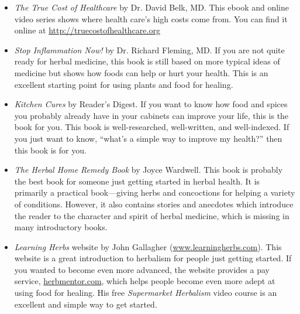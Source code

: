\begin{itemize}
\item 
\textit{The True Cost of Healthcare} by Dr. David Belk, MD.  This ebook and online
video series shows where health care's high costs come from.  You can find it online
at \url{http://truecostofhealthcare.org}
\item 
\textit{Stop Inflammation Now!} by Dr. Richard Fleming, MD. If you are not quite
ready for herbal medicine, this book is still based on more typical
ideas of medicine but shows how foods can help or hurt your health.
This is an excellent starting point for using plants and food for
healing.
\item
\textit{Kitchen Cures} by Reader's Digest.  If you want to know how food and spices
you probably already have in your cabinets can improve your life, this is the book
for you.  This book is well-researched, well-written, and well-indexed.  If you 
just want to know, ``what's a simple way to improve my health?'' then this book
is for you. 
\enlargethispage{-\baselineskip} %
\item 
\textit{The Herbal Home Remedy Book} by Joyce Wardwell. This book is
probably the best book for someone just getting started in herbal
health. It is primarily a practical book---giving herbs and concoctions
for helping a variety of conditions. However, it also contains stories
and anecdotes which introduce the reader to the character and spirit of herbal
medicine, which is missing in many introductory books.
\item 
\textit{Learning Herbs} website by John Gallagher
(\url{www.learningherbs.com}). This website is a great introduction to
herbalism for people just getting started.  If you wanted
to become even more advanced, the website provides a pay service,
\url{herbmentor.com}, which helps people become even more adept at using food
for healing.  His free \textit{Supermarket Herbalism} video course is
an excellent and simple way to get started.
\end{itemize}

